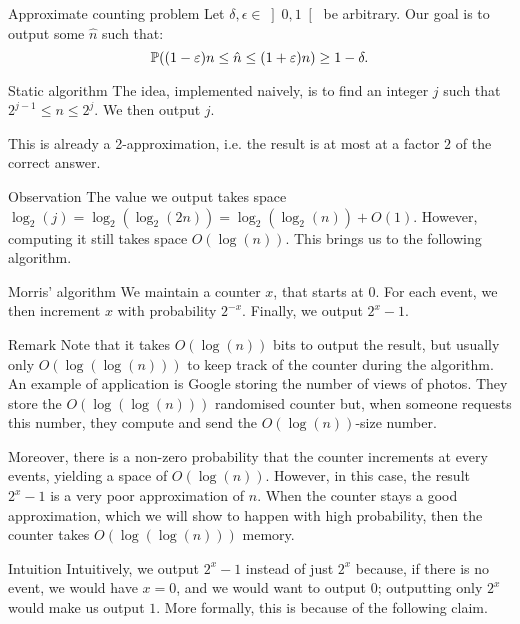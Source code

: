 \documentclass[a4paper]{article}
\begin{document}
\begin{parag}{Approximate counting problem}
    Let $\delta, \epsilon \in \left]0, 1\right[ $ be arbitrary. Our goal is to output some $\hat{n}$ such that: 
    \[\prob\left(\left(1 - \epsilon\right) n \leq \hat{n} \leq \left(1 + \epsilon\right) n\right) \geq 1 - \delta.\]
\end{parag}

\begin{parag}{Static algorithm}
    The idea, implemented naively, is to find an integer $j$ such that $2^{j-1} \leq n \leq 2^j$. We then output $j$. 

    This is already a 2-approximation, i.e. the result is at most at a factor $2$ of the correct answer.

    \begin{subparag}{Observation}
        The value we output takes space $\log_2\left(j\right) = \log_2\left(\log_2\left(2n\right)\right) = \log_2\left(\log_2\left(n\right)\right) + O\left(1\right)$. However, computing it still takes space $O\left(\log\left(n\right)\right)$. This brings us to the following algorithm.
    \end{subparag}
\end{parag}

\begin{parag}{Morris' algorithm}
    We maintain a counter $x$, that starts at $0$. For each event, we then increment $x$ with probability $2^{-x}$. Finally, we output $2^x - 1$.

    \begin{subparag}{Remark}
        Note that it takes $O\left(\log\left(n\right)\right)$ bits to output the result, but usually only $O\left(\log\left(\log\left(n\right)\right)\right)$ to keep track of the counter during the algorithm. An example of application is Google storing the number of views of photos. They store the $O\left(\log\left(\log\left(n\right)\right)\right)$ randomised counter but, when someone requests this number, they compute and send the $O\left(\log\left(n\right)\right)$-size number.

        Moreover, there is a non-zero probability that the counter increments at every events, yielding a space of $O\left(\log\left(n\right)\right)$. However, in this case, the result $2^x - 1$ is a very poor approximation of $n$. When the counter stays a good approximation, which we will show to happen with high probability, then the counter takes $O\left(\log\left(\log\left(n\right)\right)\right)$ memory.
    \end{subparag}

    \begin{subparag}{Intuition}
        Intuitively, we output $2^x - 1$ instead of just $2^x$ because, if there is no event, we would have $x = 0$, and we would want to output $0$; outputting only $2^x$ would make us output $1$. More formally, this is because of the following claim.
    \end{subparag}
\end{parag}
\end{document}
